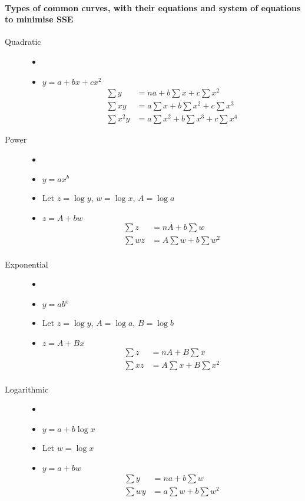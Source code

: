 \documentclass[
10pt, %
a4paper, %
]{report}
\begin{document}
\paragraph*{Types of common curves, with their equations and system of equations to minimise SSE}
\begin{description}
\item[Quadratic]
\begin{itemize}
\item[]
\item[] \(y = a + bx + cx^2\)
\begin{align*}
\textstyle\sum y &= na + b \textstyle\sum x + c \sum x^2 \\
\textstyle\sum xy &= a \textstyle\sum x + b \sum x^2 + c \sum x^3 \\
\textstyle\sum x^2y &= a \textstyle\sum x^2 + b \sum x^3 + c \sum x^4
\end{align*}	
\end{itemize}
\item[Power]
\begin{itemize}
\item[]
\item[] \(y=ax^b\)
\item[] Let \(z = \log y\), \(w = \log x\), \(A = \log a\)
\item[] \(z = A + bw\)
\begin{align*}
\textstyle\sum z &= nA + b\textstyle\sum w \\
\textstyle\sum wz &= A\textstyle\sum w + b\sum w^2 \\
\end{align*}
\end{itemize}
\item[Exponential]
\begin{itemize}
\item[]
\item[] \(y=ab^x\)
\item[] Let \(z = \log y\), \(A = \log a\), \(B = \log b\)
\item[] \(z = A + Bx\)
\begin{align*}
\textstyle\sum z &= nA + B\textstyle\sum x \\
\textstyle\sum xz &= A\textstyle\sum x + B\sum x^2 \\
\end{align*}
\end{itemize}
\item[Logarithmic]
\begin{itemize}
\item[]
\item[] \(y=a+b\log x\)
\item[] Let \(w = \log x\)
\item[] \(y = a+bw\)
\begin{align*}
\textstyle\sum y &= na + b\textstyle\sum w \\
\textstyle\sum wy &= a\textstyle\sum w + b\sum w^2 \\
\end{align*}
\end{itemize}
\end{description}
\end{document}
